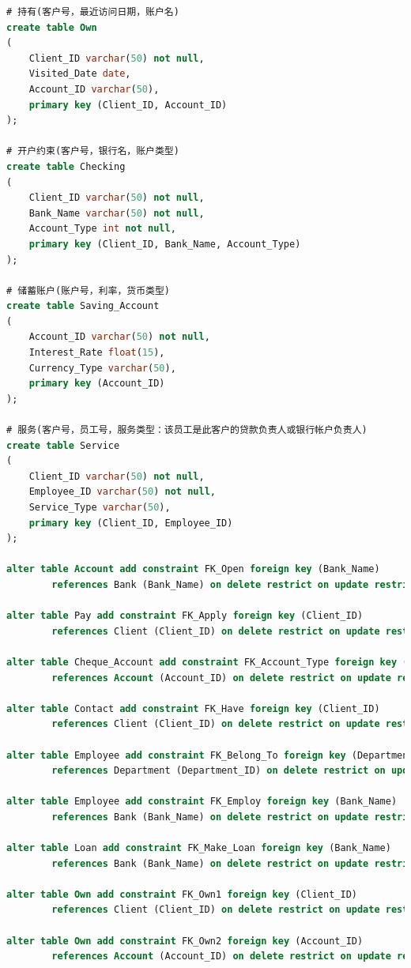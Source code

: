 \documentclass{article}
\begin{document}
\begin{lstlisting}[language=sql]
# 持有(客户号，最近访问日期，账户名)
create table Own
(
    Client_ID varchar(50) not null,
    Visited_Date date,
    Account_ID varchar(50),
    primary key (Client_ID, Account_ID)
);

# 开户约束(客户号，银行名，账户类型)
create table Checking
(
    Client_ID varchar(50) not null,
    Bank_Name varchar(50) not null,
    Account_Type int not null,
    primary key (Client_ID, Bank_Name, Account_Type)
);

# 储蓄账户(账户号，利率，货币类型)
create table Saving_Account
(
    Account_ID varchar(50) not null,
    Interest_Rate float(15),
    Currency_Type varchar(50),
    primary key (Account_ID)
);

# 服务(客户号，员工号，服务类型：该员工是此客户的贷款负责人或银行帐户负责人)
create table Service
(
    Client_ID varchar(50) not null,
    Employee_ID varchar(50) not null,
    Service_Type varchar(50),
    primary key (Client_ID, Employee_ID)
);

alter table Account add constraint FK_Open foreign key (Bank_Name)
        references Bank (Bank_Name) on delete restrict on update restrict;

alter table Pay add constraint FK_Apply foreign key (Client_ID)
        references Client (Client_ID) on delete restrict on update restrict;

alter table Cheque_Account add constraint FK_Account_Type foreign key (Account_ID)
        references Account (Account_ID) on delete restrict on update restrict;

alter table Contact add constraint FK_Have foreign key (Client_ID)
        references Client (Client_ID) on delete restrict on update restrict;

alter table Employee add constraint FK_Belong_To foreign key (Department_ID)
        references Department (Department_ID) on delete restrict on update restrict;

alter table Employee add constraint FK_Employ foreign key (Bank_Name)
        references Bank (Bank_Name) on delete restrict on update restrict;

alter table Loan add constraint FK_Make_Loan foreign key (Bank_Name)
        references Bank (Bank_Name) on delete restrict on update restrict;

alter table Own add constraint FK_Own1 foreign key (Client_ID)
        references Client (Client_ID) on delete restrict on update restrict;

alter table Own add constraint FK_Own2 foreign key (Account_ID)
        references Account (Account_ID) on delete restrict on update restrict;


\end{lstlisting}
\end{document}
